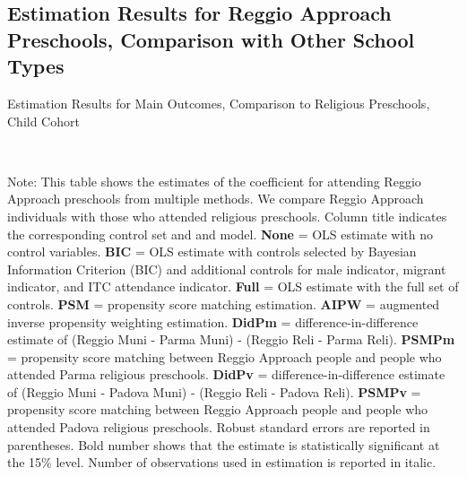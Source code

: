 






\subsection{Estimation Results for Reggio Approach Preschools, Comparison with Other School Types} \label{app:comparison-reli-stat}

\begin{table}[H] \caption{Estimation Results for Main Outcomes, Comparison to Religious Preschools, Child Cohort} \label{ols-M-child-reg-reli}
\scalebox{0.8}{}
\vspace{1ex} \\
\footnotesize\raggedright{Note: This table shows the estimates of the coefficient for attending Reggio Approach preschools from multiple methods. We compare Reggio Approach individuals with those who attended religious preschools. Column title indicates the corresponding control set and and model. \textbf{None} = OLS estimate with no control variables. \textbf{BIC} = OLS estimate with controls selected by Bayesian Information Criterion (BIC) and additional controls for male indicator, migrant indicator, and ITC attendance indicator. \textbf{Full} = OLS estimate with the full set of controls. \textbf{PSM} =  propensity score matching estimation. \textbf{AIPW} = augmented inverse propensity weighting estimation. \textbf{DidPm} = difference-in-difference estimate of (Reggio Muni - Parma Muni) - (Reggio Reli - Parma Reli). \textbf{PSMPm} = propensity score matching between Reggio Approach people and people who attended Parma religious preschools. \textbf{DidPv} = difference-in-difference estimate of (Reggio Muni - Padova Muni) - (Reggio Reli - Padova Reli). \textbf{PSMPv} = propensity score matching between Reggio Approach people and people who attended Padova religious preschools. Robust standard errors are reported in parentheses. Bold number shows that the estimate is statistically significant at the 15\% level. Number of observations used in estimation is reported in italic.}

\end{table}


